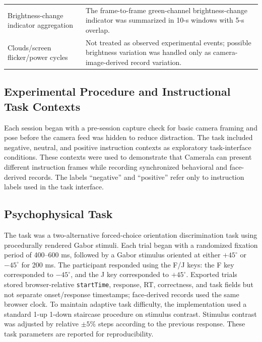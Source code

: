\documentclass[dvipdfmx]{ehis}
\begin{document}
\begin{table}[t]
\begin{center}
\begin{tabular}{p{}p{}p{}}
Brightness-change indicator aggregation & \multicolumn{2}{p{0.64\textwidth}}{The frame-to-frame green-channel brightness-change indicator was summarized in 10-s windows with 5-s overlap.} \\
Clouds/screen flicker/power cycles & \multicolumn{2}{p{0.64\textwidth}}{Not treated as observed experimental events; possible brightness variation was handled only as camera-image-derived record variation.} \\
\bottomrule
\end{tabular}
\end{center}
\end{table}

\subsection{Experimental Procedure and Instructional Task Contexts}
Each session began with a pre-session capture check for basic camera framing and pose before the camera feed was hidden to reduce distraction.
The task included negative, neutral, and positive instruction contexts as exploratory task-interface conditions.
These contexts were used to demonstrate that Camerala can present different instruction frames while recording synchronized behavioral and face-derived records.
The labels ``negative'' and ``positive'' refer only to instruction labels used in the task interface.

\subsection{Psychophysical Task}
The task was a two-alternative forced-choice orientation discrimination task using procedurally rendered Gabor stimuli.
Each trial began with a randomized fixation period of 400--600 ms, followed by a Gabor stimulus oriented at either $+45^\circ$ or $-45^\circ$ for 200 ms.
The participant responded using the F/J keys: the F key corresponded to $-45^\circ$, and the J key corresponded to $+45^\circ$.
Exported trials stored browser-relative \texttt{startTime}, response, RT, correctness, and task fields but not separate onset/response timestamps; face-derived records used the same browser clock.
To maintain adaptive task difficulty, the implementation used a standard 1-up 1-down staircase procedure on stimulus contrast.
Stimulus contrast was adjusted by relative $\pm 5\%$ steps according to the previous response.
These task parameters are reported for reproducibility.
\end{document}
